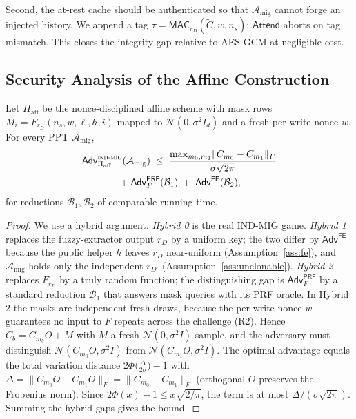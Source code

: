 Second, the at-rest cache should be authenticated so that
$\mathcal{A}_{\mathrm{mig}}$ cannot forge an injected history. We append a tag
$\tau=\mathsf{MAC}_{r_D}(\tilde C,w,n_s)$; $\mathsf{Attend}$ aborts on tag mismatch.
This closes the integrity gap relative to AES-GCM at negligible cost.

\subsection{Security Analysis of the Affine Construction}
\label{sec:theory-analysis}

\begin{theorem}
\label{thm:confidentiality}
Let $\Pi_{\mathrm{aff}}$ be the nonce-disciplined affine scheme with mask rows
$M_i=F_{r_D}(n_s,w,\ell,h,i)$ mapped to $\mathcal{N}(0,\sigma^2 I_d)$ and a fresh
per-write nonce $w$. For every PPT $\mathcal{A}_{\mathrm{mig}}$,
\begin{multline*}
\mathsf{Adv}^{\textsc{ind-mig}}_{\Pi_{\mathrm{aff}}}(\mathcal{A}_{\mathrm{mig}})
\;\le\;
\frac{\max_{m_0,m_1}\lVert C_{m_0}-C_{m_1}\rVert_F}{\sigma\sqrt{2\pi}}\\
\;+\;\mathsf{Adv}^{\mathsf{PRF}}_{F}(\mathcal{B}_1)
\;+\;\mathsf{Adv}^{\mathsf{FE}}(\mathcal{B}_2),
\end{multline*}
for reductions $\mathcal{B}_1,\mathcal{B}_2$ of comparable running time.
\end{theorem}

\begin{proof}
We use a hybrid argument.
\emph{Hybrid 0} is the real \textsc{IND-MIG} game.
\emph{Hybrid 1} replaces the fuzzy-extractor output $r_D$ by a uniform key; the
two differ by $\mathsf{Adv}^{\mathsf{FE}}$ because the public helper $h$ leaves
$r_D$ near-uniform (Assumption~\ref{ass:fe}), and $\mathcal{A}_{\mathrm{mig}}$ holds
only the independent $r_{D'}$ (Assumption~\ref{ass:unclonable}).
\emph{Hybrid 2} replaces $F_{r_D}$ by a truly random function; the distinguishing
gap is $\mathsf{Adv}^{\mathsf{PRF}}_F$ by a standard reduction $\mathcal{B}_1$ that
answers mask queries with its PRF oracle.
In Hybrid 2 the masks are independent fresh draws, because the per-write nonce $w$
guarantees no input to $F$ repeats across the challenge (R2). Hence
$\tilde C_b=C_{m_b}O+M$ with $M$ a fresh $\mathcal{N}(0,\sigma^2 I)$ sample, and the
adversary must distinguish $\mathcal{N}(C_{m_0}O,\sigma^2 I)$ from
$\mathcal{N}(C_{m_1}O,\sigma^2 I)$. The optimal advantage equals the total
variation distance $2\Phi\!\big(\tfrac{\Delta}{2\sigma}\big)-1$ with
$\Delta=\lVert C_{m_0}O-C_{m_1}O\rVert_F=\lVert C_{m_0}-C_{m_1}\rVert_F$ (orthogonal
$O$ preserves the Frobenius norm). Since $2\Phi(x)-1\le x\sqrt{2/\pi}$,
the term is at most $\Delta/(\sigma\sqrt{2\pi})$. Summing the hybrid gaps gives the
bound.
\end{proof}

